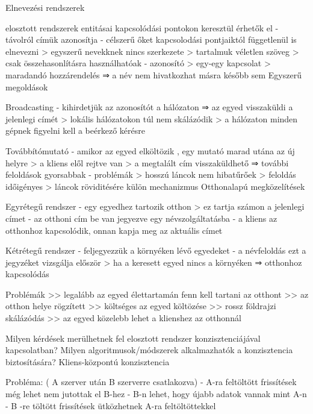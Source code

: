 \documentclass[12pt]{article}
\begin{document}
\begin{description}
        Elnevezési rendszerek
    \item elosztott rendszerek entitásai kapcsolódási pontokon keresztül érhetők el
        - távolról címük azonosítja
        - célszerű őket kapcsolodási pontjaiktól függetlenül is elnevezni
        > egyszerű nevekknek nincs szerkezete
        > tartalmuk véletlen szöveg
        > csak összehasonlításra használhatóak
        - azonosító
        > egy-egy kapcsolat
        > maradandó hozzárendelés
        ⇒ a név nem hivatkozhat másra később sem
        Egyszerű megoldások 
    \item Broadcasting
        - kihirdetjük az azonosítót a hálózaton ⇒ az egyed visszaküldi a jelenlegi címét
        > lokális hálózatokon túl nem skálázódik
        > a hálózaton minden gépnek figyelni kell a beérkező kérésre 
    \item Továbbítómutató
        - amikor az egyed elköltözik , egy mutató marad utána az új helyre
        > a kliens elől rejtve van
        > a megtalált cím visszaküldhető ⇒ további feloldások gyorsabbak
        - problémák
        > hosszú láncok nem hibatűrőek
        > feloldás időigényes
        > láncok röviditésére külön mechanizmus
        Otthonalapú megközelítések
    \item Egyrétegű rendszer
        - egy egyedhez tartozik otthon
        > ez tartja számon a jelenlegi címet
        - az otthoni cím be van jegyezve egy névszolgáltatásba
        - a kliens az otthonhoz kapcsolódik, onnan kapja meg az aktuális címet
    \item Kétrétegű rendszer
        - feljegyezzük a környéken lévő egyedeket
        - a névfeloldás ezt a jegyzéket vizsgálja először
        > ha a keresett egyed nincs a környéken ⇒ otthonhoz kapcsolódás
    \item Problémák
        >> legalább az egyed élettartamán fenn kell tartani az otthont
        >> az otthon helye rögzített >> költséges az egyed költözése
        >> rossz földrajzi skálázódás
        >> az egyed közelebb lehet a klienshez az otthonnál
    \item  Milyen kérdések merülhetnek fel elosztott rendszer konzisztenciájával kapcsolatban? Milyen algoritmusok/módszerek alkalmazhatók a konzisztencia biztosítására? 
        Kliens-központú konzisztencia
    \item Probléma: ( A szerver után B szerverre csatlakozva)
        - A-ra feltöltött frissítések még lehet nem jutottak el B-hez
        - B-n lehet, hogy újabb adatok vannak mint A-n
        - B -re töltött frissítések ütközhetnek A-ra feltöltöttekkel

\end{description}
\end{document}

